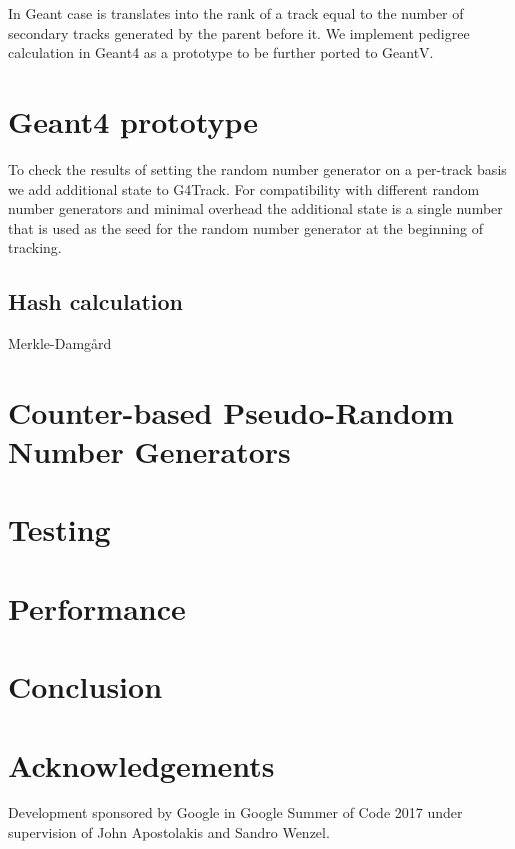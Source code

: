 \documentclass[a4paper, titlepage, 12pt]{article} %
\newcommand{\MD}{Merkle-Damg\r{a}rd}
\begin{document}
   In Geant case is translates into the rank of a track equal to the number of secondary tracks generated by the parent before it.
   We implement pedigree calculation in Geant4 as a prototype to be further ported to GeantV.
   
  
 \section{Geant4 prototype}
  To check the results of setting the random number generator on a per-track basis we add additional state to G4Track.
  For compatibility with different random number generators and minimal overhead the additional state is a single number that is used as the seed for the random number generator at the beginning of tracking.
 
  \subsection{Hash calculation}
  
   \MD\ \cite{Damgard1990, Merkle1990}
   
 \section{Counter-based Pseudo-Random Number Generators}
 
 
 \section{Testing}
 
 \section{Performance}
 
 
 \section{Conclusion}
 
 \section{Acknowledgements}
  Development sponsored by Google in Google Summer of Code 2017 under supervision of John Apostolakis and Sandro Wenzel.
 
 
 
 
 \appendix
  
\end{document}
